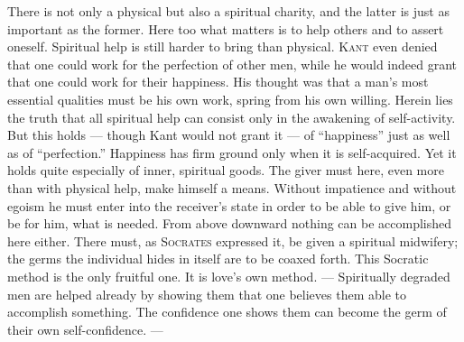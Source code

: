 \documentclass[12pt,a4paper,openany]{book}
\begin{document}
There is not only a physical but also a spiritual charity, and the latter is just as important as the former. Here
too what matters is to help others and to assert oneself. Spiritual help is still harder to bring than physical.
\textsc{Kant} even denied that one could work for the perfection of other men, while he would indeed grant that one
could work for their happiness. His thought was that a man's most essential qualities must be his own work, spring
from his own willing. Herein lies the truth that all spiritual help can consist only in the awakening of
self-activity. But this holds --- though Kant would not grant it --- of ``happiness'' just as well as of
``perfection.'' Happiness has firm ground only when it is self-acquired. Yet it holds quite especially of inner,
spiritual goods. The giver must here, even more than with physical help, make himself a means. Without impatience and
without egoism he must enter into the receiver's state in order to be able to give him, or be for him, what is
needed. From above downward nothing can be accomplished here either. There must, as \textsc{Socrates} expressed it, be
given a spiritual midwifery; the germs the individual hides in itself are to be coaxed forth. This Socratic method is
the only fruitful one. It is love's own method. --- Spiritually degraded men are helped already by showing them that
one believes them able to accomplish something. The confidence one shows them can become the germ of their own
self-confidence. ---
\end{document}
